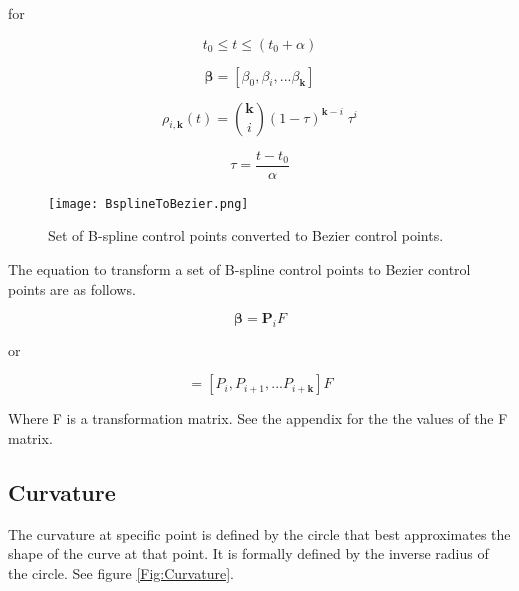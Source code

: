 \documentclass{article}
\begin{document}
for

\begin{equation}
    t_0 \leq t \leq (t_0 + \alpha)
\end{equation}

\begin{equation}
    \boldsymbol{\beta} = [\beta_0, \beta_i, ... \beta_{\textbf{k}}]
\end{equation}

\begin{equation}
    \rho_{i,\textbf{k}}(t) = \binom{\textbf{k}}{i}(1 - \tau)^{\textbf{k}-i}\;\tau^i
\end{equation}

\begin{equation}
    \tau = \frac{t-t_0}{\alpha}
\end{equation}
    
\begin{figure}[H]
\begin{center}
\texttt{[image: BsplineToBezier.png]}
\end{center}
\caption{Set of B-spline control points converted to Bezier control points.}
\label{Fig:BsplineToBezier}
\end{figure}

The equation to transform a set of B-spline control points to Bezier control points are as follows.

\begin{equation}
    \boldsymbol{\beta} = \textbf{P}_i F
\end{equation}

or

\begin{equation}
    [\beta_0, \beta_1, ... \beta_{\textbf{k}}] = [P_i, P_{i+1}, ... P_{i+\textbf{k}}] F
\end{equation}

Where F is a transformation matrix. See the appendix for the the values of the F matrix.

\subsection{Curvature}

The curvature at specific point is defined by the circle that best approximates the shape of the curve at that point. It is formally defined by the inverse radius of the circle. See figure \ref{Fig:Curvature}. 
\end{document}
